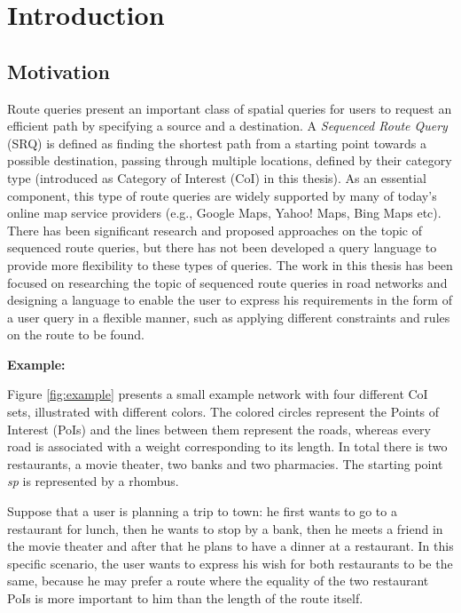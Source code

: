 \chapter{Introduction}
\label{sec:intro}

\section{Motivation}
\label{sec:motivation}
Route queries present an important class of spatial queries for users to request an efficient path by specifying a source and a destination. A \textit{Sequenced Route Query} (SRQ) is defined as finding the shortest path from a starting point towards a possible destination, passing through multiple locations, defined by their category type (introduced as Category of Interest (CoI) in this thesis). As an essential component, this type of route queries are widely supported by many of today's online map service providers (e.g., Google Maps, Yahoo! Maps, Bing Maps etc). There has been significant research and proposed approaches on the topic of sequenced route queries, but there has not been developed a query language to provide more flexibility to these types of queries. The work in this thesis has been focused on researching the topic of sequenced route queries in road networks and designing a language to enable the user to express his requirements in the form of a user query in a flexible manner, such as applying different constraints and rules on the route to be found.

\textbf{Example:}

Figure \ref{fig:example} presents a small example network with four different CoI sets, illustrated with different colors. The colored circles represent the Points of Interest (PoIs) and the lines between them represent the roads, whereas every road is associated with a weight corresponding to its length. In total there is two restaurants, a movie theater, two banks and two pharmacies. The starting point \textit{sp} is represented by a rhombus.

Suppose that a user is planning a trip to town: he first wants to go to a restaurant for lunch, then he wants to stop by a bank, then he meets a friend in the movie theater and after that he plans to have a dinner at a restaurant. In this specific scenario, the user wants to express his wish for both restaurants to be the same, because he may prefer a route where the equality of the two restaurant PoIs is more important to him than the length of the route itself.

